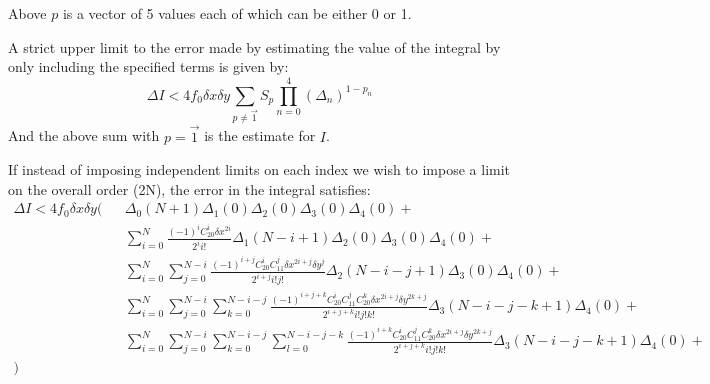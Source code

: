 \documentclass{article}
\begin{document}
Above $p$ is a vector of 5 values each of which can be either 0 or 1.

A strict upper limit to the error made by estimating the value of the
integral by only including the specified terms is given by:
\begin{equation}
	\Delta I < 4 f_0 \delta x \delta y \sum_{p\ne\overrightarrow{1}}
	S_p \prod_{n=0}^4 (\Delta_n)^{1-p_n}
\end{equation}
And the above sum with $p=\overrightarrow{1}$ is the estimate for $I$.

If instead of imposing independent limits on each index we wish to impose a
limit on the overall order (2N), the error in the integral satisfies:
\begin{eqnarray}
	\Delta I < 4 f_0 \delta x \delta y \Bigg(&&
	\Delta_0(N+1)\Delta_1(0)\Delta_2(0)\Delta_3(0)\Delta_4(0) +
	\nonumber\\
%
	&&\sum_{i=0}^N \frac{(-1)^i C_{20}^i\delta x^{2i}}{2^i i!}
	\Delta_1(N-i+1)\Delta_2(0)\Delta_3(0)\Delta_4(0)+
	\nonumber\\
%
	&&\sum_{i=0}^N \sum_{j=0}^{N-i}
	\frac{(-1)^{i+j} C_{20}^i C_{11}^j \delta x^{2i+j} \delta y^j}{2^{i+j}
	i!j!}\Delta_2(N-i-j+1)\Delta_3(0)\Delta_4(0)+\nonumber\\
%
	&&\sum_{i=0}^N \sum_{j=0}^{N-i} \sum_{k=0}^{N-i-j}
	\frac{(-1)^{i+j+k} C_{20}^i C_{11}^j C_{20}^k \delta x^{2i+j} \delta
	y^{2k+j}}{2^{i+j+k} i!j!k!}\Delta_3(N-i-j-k+1)\Delta_4(0)+\nonumber\\
%
	&&\sum_{i=0}^N \sum_{j=0}^{N-i} \sum_{k=0}^{N-i-j} \sum_{l=0}^{N-i-j-k}
	\frac{(-1)^{i+k} C_{20}^i C_{11}^j C_{20}^k \delta x^{2i+j} \delta
	y^{2k+j}}{2^{i+j+k} i!j!k!}\Delta_3(N-i-j-k+1)\Delta_4(0)+\nonumber\\
	\Bigg)
\end{eqnarray}
\end{document}
